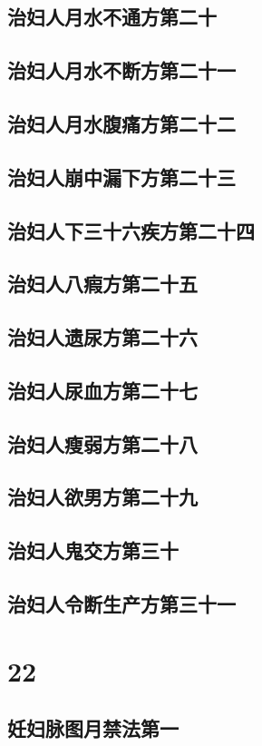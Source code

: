 \documentclass[a4paper,12pt,UTF8,twoside]{ctexbook}
\begin{document}
\chapter{治妇人月水不通方第二十}
\chapter{治妇人月水不断方第二十一}
\chapter{治妇人月水腹痛方第二十二}
\chapter{治妇人崩中漏下方第二十三}
\chapter{治妇人下三十六疾方第二十四}
\chapter{治妇人八瘕方第二十五}
\chapter{治妇人遗尿方第二十六}
\chapter{治妇人尿血方第二十七}
\chapter{治妇人瘦弱方第二十八}
\chapter{治妇人欲男方第二十九}
\chapter{治妇人鬼交方第三十}
\chapter{治妇人令断生产方第三十一}

\part{22}
\chapter{妊妇脉图月禁法第一}
\end{document}
